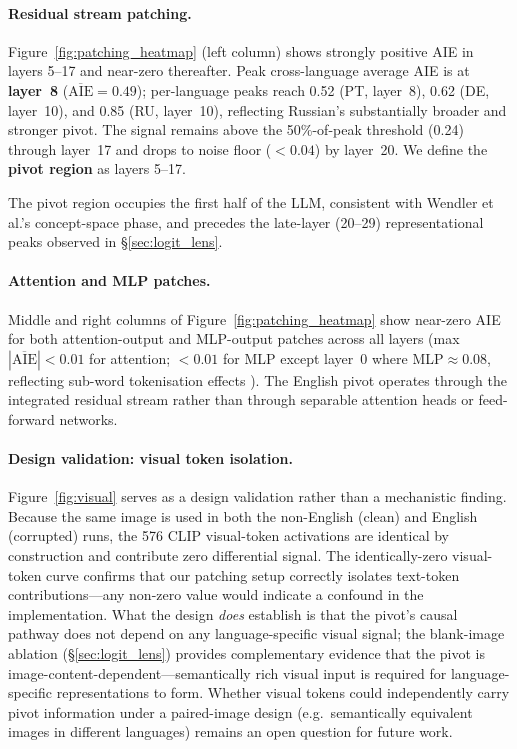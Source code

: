 \documentclass[11pt]{article}
\begin{document}
\paragraph{Residual stream patching.}
Figure~\ref{fig:patching_heatmap} (left column) shows strongly positive AIE
in layers 5--17 and near-zero thereafter.
Peak cross-language average AIE is at \textbf{layer~8}
($\overline{\mathrm{AIE}}{=}0.49$); per-language peaks reach 0.52 (PT,
layer~8), 0.62 (DE, layer~10), and 0.85 (RU, layer~10), reflecting
Russian's substantially broader and stronger pivot.
The signal remains above the 50\%-of-peak threshold (0.24) through layer~17
and drops to noise floor ($<0.04$) by layer~20.
We define the \textbf{pivot region} as layers 5--17.

The pivot region occupies the first half of the LLM, consistent with
Wendler et al.'s concept-space phase, and precedes the late-layer (20--29)
representational peaks observed in \S\ref{sec:logit_lens}.

\paragraph{Attention and MLP patches.}
Middle and right columns of Figure~\ref{fig:patching_heatmap} show near-zero
AIE for both attention-output and MLP-output patches across all layers
(max $|\overline{\mathrm{AIE}}|{<}0.01$ for attention; ${<}0.01$ for MLP
except layer~0 where MLP${\approx}0.08$, reflecting sub-word tokenisation
effects \citep{geva-etal-2022-transformer}).
The English pivot operates through the integrated residual stream rather than
through separable attention heads or feed-forward networks.

\paragraph{Design validation: visual token isolation.}
Figure~\ref{fig:visual} serves as a design validation rather than a mechanistic
finding.
Because the same image is used in both the non-English (clean) and English
(corrupted) runs, the 576 CLIP visual-token activations are identical by
construction and contribute zero differential signal.
The identically-zero visual-token curve confirms that our patching setup
correctly isolates text-token contributions---any non-zero value would indicate
a confound in the implementation.
What the design \emph{does} establish is that the pivot's causal pathway does
not depend on any language-specific visual signal; the blank-image ablation
(\S\ref{sec:logit_lens}) provides complementary evidence that the pivot is
image-content-dependent---semantically rich visual input is required for
language-specific representations to form.
Whether visual tokens could independently carry pivot information under a
paired-image design (e.g.\ semantically equivalent images in different
languages) remains an open question for future work.
\end{document}
